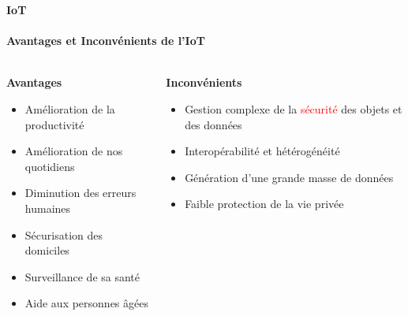 \documentclass[aspectratio=169,professionalfonts, 12pt]{beamer}
\begin{document}
\begin{frame}{\textbf{IoT}}
\framesubtitle{\textbf{Avantages et Inconvénients de l'IoT}}
\framesubtitle{}
	     \begin{columns}
     \begin{column}{0.5\textwidth}
	      		{
	      \begin{block}{\textbf{Avantages}}
	      	\begin{itemize}
	   	\item Amélioration de la productivité
  			  			
	    \item Amélioration de nos quotidiens
	      			 				
	    \item Diminution des erreurs humaines 
	      			
	      \item Sécurisation des domiciles 
	
	      	\item Surveillance de sa santé
	      	
	      	\item Aide aux personnes âgées
	      			\end{itemize}
	      		\end{block}
      		  }
	      	\end{column}
	  \begin{column}{0.5\textwidth}
	      		{
	      \begin{alertblock}{\textbf{Inconvénients}}
	      	\begin{itemize}
			  	
	    \item Gestion complexe de la \textcolor{red}{sécurité} des objets et des données 
	      			 				
	    \item Interopérabilité et hétérogénéité
	      	\item Génération d'une grande masse de données 		
	      \item  Faible protection de la vie privée
	      			\end{itemize}
	      		\end{alertblock}
      		  }
	      	\end{column}
      	\end{columns}	
\end{frame}
\end{document}
